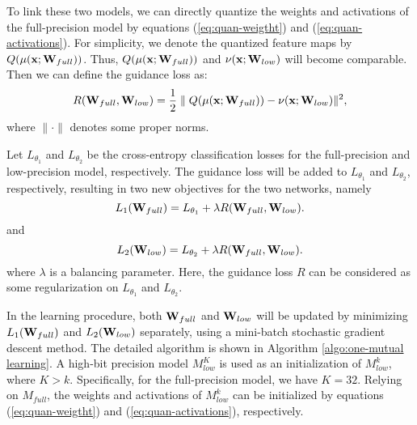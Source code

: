\documentclass[10pt,twocolumn,letterpaper]{article}
\begin{document}
%

%
%




%




%



%


%

%
%

%
%
%



%

To link these two models,  we can directly quantize the weights and activations of the full-precision model by equations (\ref{eq:quan-weigtht}) and (\ref{eq:quan-activations}). For simplicity, we denote the quantized feature maps by  $Q(\mu ({\bf{x}};{{\bf{W}}_{{full}}}))$. Thus, $Q(\mu ({\bf{x}};{{\bf{W}}_{{full}}}))$ and  $\nu ({\bf{x}};{{\bf{W}}_{{low}}})$ will become comparable. Then we can define the guidance loss as:
\begin{equation}
	R({{\bf{W}}_{full}},{{\bf{W}}_{low}}) = \frac{1}{2}\parallel Q(\mu ({\bf{x}};{{\bf{W}}_{{full}}})) - \nu ({\bf{x}};{{\bf{W}}_{{low}}}){\parallel^2},
\end{equation}
where $\parallel\cdot\parallel$ denotes some proper norms.
%


Let ${L_{{\theta _1}}}$ and ${L_{{\theta _2}}}$ be the cross-entropy classification losses for the full-precision and low-precision model, respectively. The guidance loss will be added to ${L_{{\theta _1}}}$ and ${L_{{\theta _2}}}$, respectively, resulting in two new objectives for the two networks, namely
\begin{equation} \label{eq:objective1}
	L_1({{\bf{W}}_{full}})  = {L_{{\theta _1}}} + \lambda R({{\bf{W}}_{full}},{{\bf{W}}_{low}}).
\end{equation}
and
\begin{equation} \label{eq:objective2}
	L_2({{\bf{W}}_{low}})  = {L_{{\theta _2}}} +  \lambda R({{\bf{W}}_{full}},{{\bf{W}}_{low}}).
\end{equation}
where $\lambda$ is a balancing parameter. Here, the guidance loss $R$ can be considered as some regularization on ${L_{{\theta _1}}}$ and ${L_{{\theta _2}}}$.


%
In the learning procedure, both ${{\bf{W}}_{full}}$ and ${{\bf{W}}_{low}}$ will be updated by minimizing $L_1({{\bf{W}}_{full}})$ and $L_2({{\bf{W}}_{low}})$ separately, using a mini-batch stochastic gradient descent method. The detailed algorithm is shown in Algorithm \ref{algo:one-mutual learning}. A high-bit precision model $M_{low}^K$ is used as an initialization of $M_{low}^k$, where $K>k$. Specifically, for the full-precision model, we have $K=32$. Relying on $M_{full}$, the weights and activations of $M_{low}^k$ can be initialized by equations (\ref{eq:quan-weigtht}) and (\ref{eq:quan-activations}), respectively.
\end{document}
